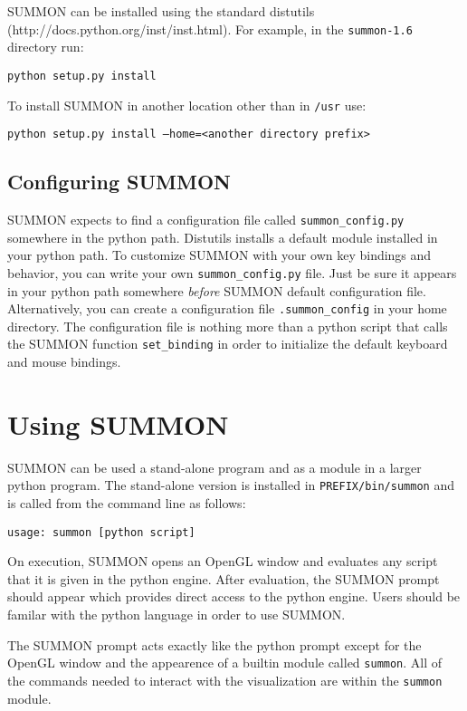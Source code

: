 \documentclass[12pt]{article}
\newcommand{\code}[1]{{\tt #1}}
\newcommand{\codeblock}[1]{\vspace{.1in} {\tt #1} \vspace{.1in}}
\begin{document}
SUMMON can be installed using the standard distutils 
(http://docs.python.org/inst/inst.html).  For example, in the \code{summon-1.6}
directory run:

\codeblock{python setup.py install}

To install SUMMON in another location other than in \code{/usr} use:

\codeblock{python setup.py install --home=<another directory prefix>}


\subsection{Configuring SUMMON}

SUMMON expects to find a configuration file called  \code{summon\_config.py}
somewhere in the python path.  Distutils installs a default module installed in
your python path.  To customize SUMMON with your own key bindings and behavior,
you can write your own \code{summon\_config.py} file.  Just be sure it appears
in your python path somewhere {\em before} SUMMON default configuration file. 
Alternatively, you can create a configuration file \code{.summon\_config} in
your home directory.  The configuration file is nothing more than a python
script that calls the SUMMON function  \code{set\_binding} in order to
initialize the default keyboard and mouse  bindings.



\section{Using SUMMON}
\label{sec:using}

SUMMON can be used a stand-alone program and as a module in a larger python
program.  The stand-alone version is installed in \code{PREFIX/bin/summon} and
is called from the command line as follows:

\codeblock{usage: summon [python script]}

On execution, SUMMON opens an OpenGL window and evaluates any script that it is
given in the python engine. After evaluation, the SUMMON prompt should appear
which provides direct access to the python engine.  Users should be familar with
the python language in order to use SUMMON.

The SUMMON prompt acts exactly like the python prompt except for the OpenGL
window and the appearence of a builtin module called \code{summon}.  All of the
commands needed to interact with the visualization are within the \code{summon} 
module.  
\end{document}
